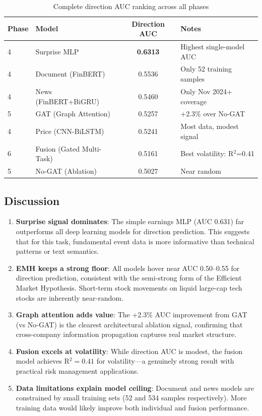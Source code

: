 \documentclass[12pt,a4paper]{article}
\begin{document}
\begin{table}[H]
\centering
\begin{tabular}{llcl}
\toprule
\textbf{Phase} & \textbf{Model} & \textbf{Direction AUC} & \textbf{Notes} \\
\midrule
4 & Surprise MLP & \textbf{0.6313} & Highest single-model AUC \\
4 & Document (FinBERT) & 0.5536 & Only 52 training samples \\
4 & News (FinBERT+BiGRU) & 0.5460 & Only Nov 2024+ coverage \\
5 & GAT (Graph Attention) & 0.5257 & +2.3\% over No-GAT \\
4 & Price (CNN-BiLSTM) & 0.5241 & Most data, modest signal \\
6 & Fusion (Gated Multi-Task) & 0.5161 & Best volatility: R$^2$=0.41 \\
5 & No-GAT (Ablation) & 0.5027 & Near random \\
\bottomrule
\end{tabular}
\caption{Complete direction AUC ranking across all phases}
\label{tab:cross_phase}
\end{table}

\subsection{Discussion}

\begin{enumerate}
    \item \textbf{Surprise signal dominates}: The simple earnings MLP (AUC 0.631) far outperforms all deep learning models for direction prediction. This suggests that for this task, fundamental event data is more informative than technical patterns or text semantics.
    
    \item \textbf{EMH keeps a strong floor}: All models hover near AUC 0.50--0.55 for direction prediction, consistent with the semi-strong form of the Efficient Market Hypothesis. Short-term stock movements on liquid large-cap tech stocks are inherently near-random.
    
    \item \textbf{Graph attention adds value}: The +2.3\% AUC improvement from GAT (vs No-GAT) is the clearest architectural ablation signal, confirming that cross-company information propagation captures real market structure.
    
    \item \textbf{Fusion excels at volatility}: While direction AUC is modest, the fusion model achieves R$^2 = 0.41$ for volatility---a genuinely strong result with practical risk management applications.
    
    \item \textbf{Data limitations explain model ceiling}: Document and news models are constrained by small training sets (52 and 534 samples respectively). More training data would likely improve both individual and fusion performance.
\end{enumerate}
\end{document}
